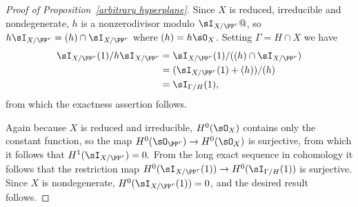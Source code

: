 \begin{proof}[Proof of Proposition~\ref{arbitrary hyperplane}]
Since
$X$ is reduced, irreducible and  \null nondegenerate,
$h$ is a nonzerodivisor modulo
$\sI_{X/\PP^r}@$, so $h\sI_{X/\PP^r} = (h)\cap \sI_{X/\PP^r}$ where
$(h) = h\sO_{X}$.
Setting $\Gamma = {H\cap X}$
we have
$$
\begin{aligned}
\sI_{X/\PP^r}(1)/h\sI_{X/\PP^r} &= \sI_{X/\PP^r}(1)/((h)\cap\sI_{X/\PP^r})\\
 &=(\sI_{X/\PP^r}(1)+(h))/(h)\\
 &= \sI_{\Gamma/H}(1),
\end{aligned}
$$
from which the exactness assertion follows.

 Again because $X$ is reduced and irreducible, $H^0(\sO_X)$ contains only the constant function, so the map $H^0(\sO_{\PP^r}) \to H^0(\sO_X)$ is surjective,
from which it follows that $H^1(\sI_{X/\PP^r}) = 0.$ From the long exact sequence in cohomology it follows that
 the restriction map $H^0(\sI_{X/\PP^r}(1))\to H^0(\sI_{\Gamma/H}(1))$ is surjective. Since
$X$ is nondegenerate, $H^0(\sI_{X/\PP^r}(1)) = 0$, and the desired result follows.
\unif
\end{proof}


